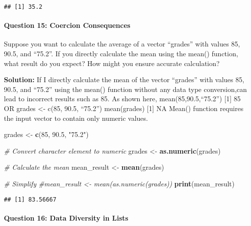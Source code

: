 \documentclass[
]{article}
\newenvironment{Shaded}{\begin{snugshade}}{\end{snugshade}}
\newcommand{\CommentTok}[1]{\textcolor[rgb]{0.56,0.35,0.01}{\textit{#1}}}
\newcommand{\DecValTok}[1]{\textcolor[rgb]{0.00,0.00,0.81}{#1}}
\newcommand{\FloatTok}[1]{\textcolor[rgb]{0.00,0.00,0.81}{#1}}
\newcommand{\FunctionTok}[1]{\textcolor[rgb]{0.13,0.29,0.53}{\textbf{#1}}}
\newcommand{\NormalTok}[1]{#1}
\newcommand{\OtherTok}[1]{\textcolor[rgb]{0.56,0.35,0.01}{#1}}
\newcommand{\StringTok}[1]{\textcolor[rgb]{0.31,0.60,0.02}{#1}}
\begin{document}
\begin{verbatim}
## [1] 35.2
\end{verbatim}

\hypertarget{question-15-coercion-consequences}{%
\paragraph{Question 15: Coercion
Consequences}\label{question-15-coercion-consequences}}

Suppose you want to calculate the average of a vector ``grades'' with
values 85, 90.5, and ``75.2''. If you directly calculate the mean using
the mean() function, what result do you expect? How might you ensure
accurate calculation?

\textbf{Solution:} If I directly calculate the mean of the vector
``grades'' with values 85, 90.5, and ``75.2'' using the mean() function
without any data type conversion,can lead to incorrect results such as
85. As shown here, mean(85,90.5,``75.2'') {[}1{]} 85 OR grades
\textless- c(85, 90.5, ``75.2'') mean(grades) {[}1{]} NA Mean() function
requires the input vector to contain only numeric values.

\begin{Shaded}
\begin{Highlighting}[]
\NormalTok{grades }\OtherTok{\textless{}{-}} \FunctionTok{c}\NormalTok{(}\DecValTok{85}\NormalTok{, }\FloatTok{90.5}\NormalTok{, }\StringTok{"75.2"}\NormalTok{)}

\CommentTok{\# Convert character element to numeric}
\NormalTok{grades }\OtherTok{\textless{}{-}} \FunctionTok{as.numeric}\NormalTok{(grades)}

\CommentTok{\# Calculate the mean}
\NormalTok{mean\_result }\OtherTok{\textless{}{-}} \FunctionTok{mean}\NormalTok{(grades)}

\CommentTok{\# Simplify}
\CommentTok{\#mean\_result \textless{}{-} mean(as.numeric(grades))}
\FunctionTok{print}\NormalTok{(mean\_result)}
\end{Highlighting}
\end{Shaded}

\begin{verbatim}
## [1] 83.56667
\end{verbatim}

\hypertarget{question-16-data-diversity-in-lists}{%
\paragraph{Question 16: Data Diversity in
Lists}\label{question-16-data-diversity-in-lists}}
\end{document}
